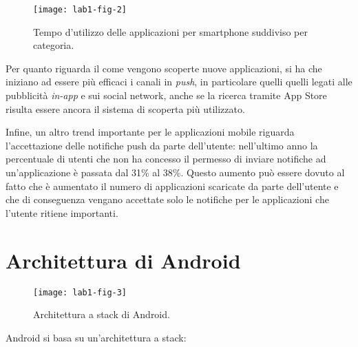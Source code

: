 \begin{figure}[htbp]
	\centering
	\texttt{[image: lab1-fig-2]}
	\caption{Tempo d'utilizzo delle applicazioni per smartphone suddiviso per categoria.}\label{lab1-fig-2}
\end{figure}


Per quanto riguarda il come vengono scoperte nuove applicazioni, si ha che iniziano ad essere più efficaci i canali in \textit{push}, in particolare quelli quelli legati alle pubblicità \textit{in-app} e sui social network, anche se la ricerca tramite App Store risulta essere ancora il sistema di scoperta più utilizzato.

Infine, un altro trend importante per le applicazioni mobile riguarda l'accettazione delle notifiche push da parte dell'utente: nell'ultimo anno la percentuale di utenti che non ha concesso il permesso di inviare notifiche ad un'applicazione è passata dal 31\% al 38\%.
Questo aumento può essere dovuto al fatto che è aumentato il numero di applicazioni scaricate da parte dell'utente e che di conseguenza vengano accettate solo le notifiche per le applicazioni che l'utente ritiene importanti.

\section{Architettura di Android}\label{architettura-di-android}

\begin{figure}[htbp]
	\centering
	\texttt{[image: lab1-fig-3]}
	\caption{Architettura a stack di Android.}
\end{figure}

Android si basa su un'architettura a stack:

